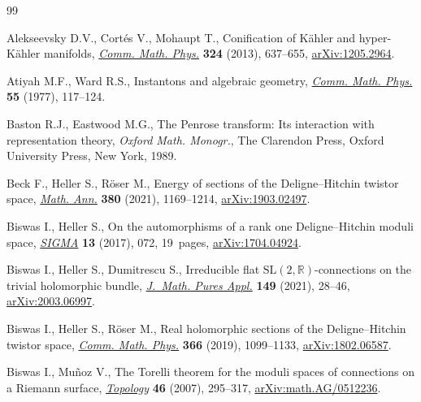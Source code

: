 \documentclass[pdftex]{sigma}
\numberwithin{equation}{section}
\theoremstyle{definition}
\begin{document}
\begin{thebibliography}{99}
\footnotesize\itemsep=0pt

Alekseevsky D.V., Cort\'es V., Mohaupt T., Conification of {K}\"ahler and
 hyper-{K}\"ahler manifolds,
 \href{https://doi.org/10.1007/s00220-013-1812-0}{\textit{Comm. Math. Phys.}}
 \textbf{324} (2013), 637--655,
 \href{http://arxiv.org/abs/1205.2964}{arXiv:1205.2964}.

Atiyah M.F., Ward R.S., Instantons and algebraic geometry,
 \href{https://doi.org/10.1007/BF01626514}{\textit{Comm. Math. Phys.}}
 \textbf{55} (1977), 117--124.

Baston R.J., Eastwood M.G., The {P}enrose transform: {I}ts interaction with representation theory, \textit{Oxford Math. Monogr.}, The
 Clarendon Press, Oxford University Press, New York, 1989.

Beck F., Heller S., R\"oser M., Energy of sections of the {D}eligne--{H}itchin
 twistor space,
 \href{https://doi.org/10.1007/s00208-020-02042-0}{\textit{Math. Ann.}}
 \textbf{380} (2021), 1169--1214,
 \href{http://arxiv.org/abs/1903.02497}{arXiv:1903.02497}.

Biswas I., Heller S., On the automorphisms of a rank one {D}eligne--{H}itchin
 moduli space, \href{https://doi.org/10.3842/SIGMA.2017.072}{\textit{SIGMA}}
 \textbf{13} (2017), 072, 19~pages,
 \href{http://arxiv.org/abs/1704.04924}{arXiv:1704.04924}.

Biswas I., Heller S., Dumitrescu S., Irreducible flat
 $\mathrm{SL}(2,\mathbb{R})$-connections on the trivial holomorphic bundle,
 \href{https://doi.org/10.1016/j.matpur.2020.12.005}{\textit{J.~Math. Pures
 Appl.}} \textbf{149} (2021), 28--46,
 \href{http://arxiv.org/abs/2003.06997}{arXiv:2003.06997}.

Biswas I., Heller S., R\"oser M., Real holomorphic sections of the
 {D}eligne--{H}itchin twistor space,
 \href{https://doi.org/10.1007/s00220-019-03340-8}{\textit{Comm. Math. Phys.}}
 \textbf{366} (2019), 1099--1133,
 \href{http://arxiv.org/abs/1802.06587}{arXiv:1802.06587}.

Biswas I., Mu\~noz V., The {T}orelli theorem for the moduli spaces of
 connections on a {R}iemann surface,
 \href{https://doi.org/10.1016/j.top.2007.02.005}{\textit{Topology}}
 \textbf{46} (2007), 295--317,
 \href{http://arxiv.org/abs/math.AG/0512236}{arXiv:math.AG/0512236}.


\end{thebibliography}
\end{document}
